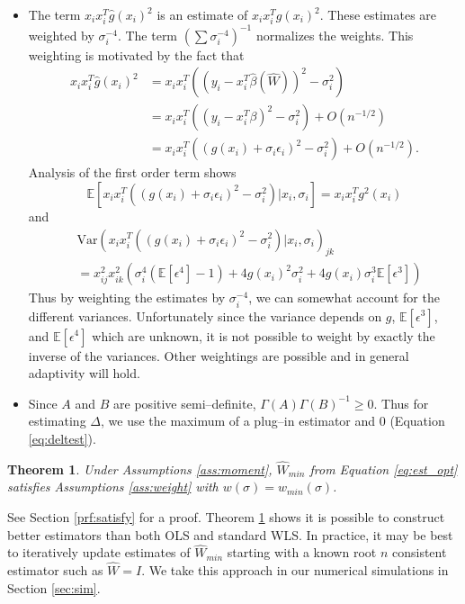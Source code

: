 \documentclass[ejs,ps,preprint]{imsart}
\numberwithin{equation}{section}
\theoremstyle{plain}
\newtheorem{thm}{Theorem}[section]
\newcommand{\Var}{\text{Var}}
\newcommand{\E}{\mathbb{E}}
\def\E{\mathbb{E}}
\begin{document}
\begin{itemize}
\item The term $x_ix_i^T\widehat{g}(x_i)^2$ is an estimate of $x_ix_i^Tg(x_i)^2$. These estimates are weighted by $\sigma_i^{-4}$. The term $(\sum \sigma_i^{-4})^{-1}$ normalizes the weights. This weighting is motivated by the fact that
\begin{align*}
x_ix_i^T\widehat{g}(x_i)^2 &= x_ix_i^T((y_i - x_i^T\widehat{\beta}(\widehat{W}))^2 - \sigma_i^2) \\
&= x_ix_i^T((y_i - x_i^T\beta)^2 - \sigma_i^2) + O(n^{-1/2})\\
& = x_ix_i^T((g(x_i) + \sigma_i\epsilon_i)^2 - \sigma_i^2) + O(n^{-1/2}).
\end{align*}
Analysis of the first order term shows
\begin{equation*}
  \E[x_ix_i^T((g(x_i) + \sigma_i\epsilon_i)^2 - \sigma_i^2)|x_i,\sigma_i] =  x_ix_i^Tg^2(x_i)
\end{equation*}
and
\begin{align*}
  &\Var(x_ix_i^T((g(x_i) + \sigma_i\epsilon_i)^2 - \sigma_i^2)|x_i,\sigma_i)_{jk} \\
  &=  x_{ij}^2x_{ik}^2(\sigma_i^4(\E[\epsilon^4] - 1) + 4g(x_i)^2\sigma_i^2 + 4g(x_i)\sigma_i^3\E[\epsilon^3])
\end{align*}
Thus by weighting the estimates by $\sigma_i^{-4}$, we can somewhat account for the different variances. Unfortunately since the variance depends on $g$, $\E[\epsilon^3]$, and $\E[\epsilon^4]$ which are unknown, it is not possible to weight by exactly the inverse of the variances. Other weightings are possible and in general adaptivity will hold. 
\item Since $A$ and $B$ are positive semi--definite, $\Gamma(A)\Gamma(B)^{-1} \geq 0$. Thus for estimating $\Delta$, we use the maximum of a plug--in estimator and $0$ (Equation \eqref{eq:deltest}).
\end{itemize}

\begin{thm}
\label{thm:satisfy}
Under Assumptions \ref{ass:moment}, $\widehat{W}_{min}$ from Equation \eqref{eq:est_opt} satisfies Assumptions \ref{ass:weight} with $w(\sigma)=w_{min}(\sigma)$.
\end{thm}
See Section \ref{prf:satisfy} for a proof. Theorem \ref{thm:satisfy} shows it is possible to construct better estimators than both OLS and standard WLS. In practice, it may be best to iteratively update estimates of $\widehat{W}_{min}$ starting with a known root $n$ consistent estimator such as $\widehat{W} = I$. We take this approach in our numerical simulations in Section \ref{sec:sim}.
\end{document}

